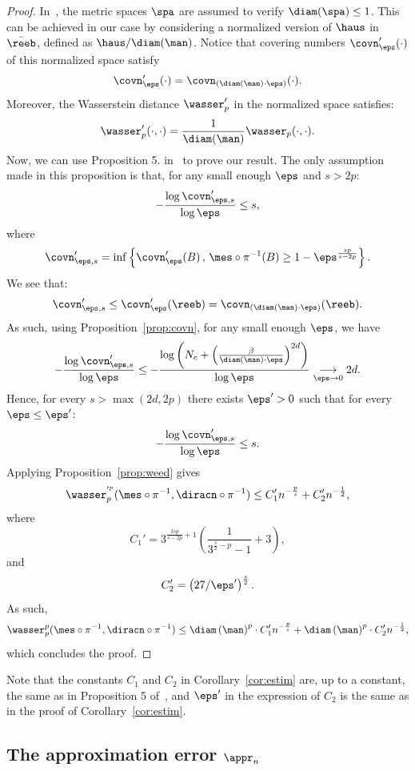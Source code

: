 \begin{proof}
In~\cite{weed2019sharp}, the metric spaces $\spa$ are assumed to verify $\diam(\spa)\leq 1$. This can be achieved in our case by considering a normalized version of $\haus$ in $\bar \reeb$, defined as $\haus/\diam(\man)$. Notice that covering numbers $\covn'_\eps(\cdot)$ of this normalized space satisfy
$$\covn'_\eps(\cdot)=\covn_{(\diam(\man)\cdot\eps)}(\cdot).$$
Moreover, the Wasserstein distance $\wasser'_p$ in the normalized space satisfies:
$$\wasser'_p(\cdot,\cdot)=\frac{1}{\diam(\man)}\wasser_p(\cdot,\cdot).$$
Now, we can use Proposition 5. in~\cite{weed2019sharp} to prove our result. The only assumption made in this proposition is that, for any small enough $\eps$ and $s>2p$: 
 $$-\frac{\log \covn'_{\eps,s}}{\log\eps}\leq s,$$
 where $$\covn'_{\eps,s}=\inf\left\{\covn'_\eps(B)\, ,\,\mes\circ\pi^{-1}(B)\geq 1-\eps^{\frac{sp}{s-2p}}\right\}.$$
 We see that:
 $$\covn'_{\eps,s}\leq\covn'_\eps(\reeb)=\covn_{(\diam(\man)\cdot\eps)}(\reeb).$$
 As such, using Proposition~\ref{prop:covn}, for any small enough $\eps$, we have
 $$-\frac{\log \covn'_{\eps,s}}{\log\eps}\leq-\frac{\log\left( N_c+\left(\frac{\beta}{\diam(\man)\cdot\eps}\right)^{2d}\right)}{\log\eps}\underset{\eps\rightarrow0}{\longrightarrow}2d.$$
 Hence, for every $s>\max(2d,2p)$ there exists $\eps'>0$ such that for every $\eps\leq\eps'$:
 $$-\frac{\log \covn'_{\eps,s}}{\log\eps}\leq s.$$
 Applying Proposition~\ref{prop:weed} gives
 $$\wasser_p^{'^p}(\mes\circ\pi^{-1},\diracn\circ\pi^{-1})\leq C_1'n^{-\frac{p}{s}}+C_2'n^{-\frac{1}{2}},$$
 where 
 $$C_1'=3^{\frac{3sp}{s-2p}+1}\left(\frac{1}{3^{\frac{s}{2}-p}-1}+3\right),$$
 and
 $$C_2'=\left(27/\eps'\right)^{\frac{s}{2}}.$$
 As such,
 $$\wasser_p^p(\mes\circ\pi^{-1},\diracn\circ\pi^{-1})\leq \diam\left(\man\right)^p\cdot C_1'n^{-\frac{p}{s}}+\diam\left(\man\right)^p\cdot C_2'n^{-\frac{1}{2}},$$
 which concludes the proof.
  \end{proof}

Note that the constants $C_1$ and $C_2$ in Corollary~\ref{cor:estim} are, up to a constant, the same as in Proposition 5 of~\cite{weed2019sharp}, and $\eps'$ in the expression of $C_2$ is the same as in the proof of Corollary~\ref{cor:estim}.  

 \subsection{The approximation error \texorpdfstring{$\appr_n$}{TEXT}}
